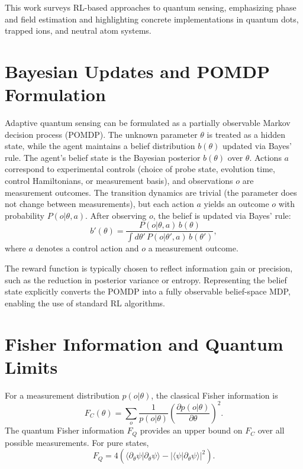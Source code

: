 \documentclass[
    aps,
    prx,
    reprint,
    superscriptaddress,
    amsmath,
    amssymb,
    longbibliography
]{revtex4-2}
\begin{document}
This work surveys RL-based approaches to quantum sensing, emphasizing
phase and field estimation and highlighting concrete implementations in
quantum dots, trapped ions, and neutral atom systems.



\section{Bayesian Updates and POMDP Formulation}

Adaptive quantum sensing can be formulated as a partially observable
Markov decision process (POMDP). The unknown parameter $\theta$ is treated
as a hidden state, while the agent maintains a belief distribution
$b(\theta)$ updated via Bayes' rule.
The agent’s belief state is the
Bayesian posterior $b(\theta)$ over $\theta$.  Actions $a$ correspond
to experimental controls (choice of probe state, evolution time,
control Hamiltonians, or measurement basis), and observations $o$ are
measurement outcomes.  The transition dynamics are trivial (the
parameter does not change between measurements), but each action $a$
yields an outcome $o$ with probability $P(o|\theta,a)$. After
observing $o$, the belief is updated via Bayes’ rule:
\begin{equation}
b'(\theta)=
\frac{P(o|\theta,a)\,b(\theta)}
{\int d\theta'\,P(o|\theta',a)\,b(\theta')},
\end{equation}
where $a$ denotes a control action and $o$ a measurement outcome.

The reward function is typically chosen to reflect information gain or
precision, such as the reduction in posterior variance or entropy.
Representing the belief state explicitly converts the POMDP into a fully
observable belief-space MDP, enabling the use of standard RL algorithms.


\section{Fisher Information and Quantum Limits}

For a measurement distribution $p(o|\theta)$, the classical Fisher
information is
\begin{equation}
F_C(\theta)=\sum_o \frac{1}{p(o|\theta)}
\left(\frac{\partial p(o|\theta)}{\partial \theta}\right)^2 .
\end{equation}
The quantum Fisher information $F_Q$ provides an upper bound on $F_C$
over all possible measurements. For pure states,
\begin{equation}
F_Q = 4\left(
\langle \partial_\theta \psi | \partial_\theta \psi \rangle
- |\langle \psi | \partial_\theta \psi \rangle|^2
\right).
\end{equation}
\end{document}
